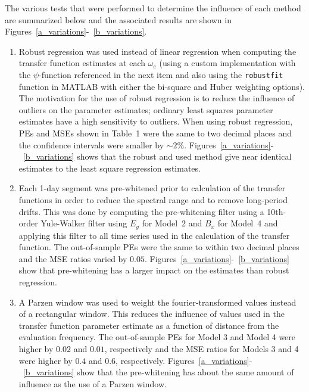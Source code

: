 \documentclass[draft,linenumbers]{agujournal2018}
\begin{document}
The various tests that were performed to determine the influence of each method are summarized below and the associated results are shown in Figures~\ref{a_variations}-~\ref{b_variations}.

\begin{enumerate}

\item Robust regression was used instead of linear regression when computing the transfer function estimates at each $\omega_e$ (using a custom implementation with the $\psi$-function referenced in the next item and also using the \texttt{robustfit} function in MATLAB with either the bi-square and Huber weighting options). The motivation for the use of robust regression is to reduce the influence of outliers on the parameter estimates; ordinary least squares parameter estimates have a high sensitivity to outliers. When using robust regression, PEs and MSEs shown in Table~1 were the same to two decimal places and the confidence intervals were smaller by $\sim 2$\%. Figures~\ref{a_variations}-~\ref{b_variations} shows that the robust and used method give near identical estimates to the least square regression estimates.

\item Each 1-day segment was pre-whitened prior to calculation of the transfer functions in order to reduce the spectral range and to remove long-period drifts. This was done by computing the pre-whitening filter using a 10th-order Yule-Walker filter using $E_y$ for Model~2 and $B_x$ for Model~4 and applying this filter to all time series used in the calculation of the transfer function. The out-of-sample PEs were the same to within two decimal places and the MSE ratios varied by $0.05$.  Figures~\ref{a_variations}-~\ref{b_variations} show that pre-whitening has a larger impact on the estimates than robust regression.

\item A Parzen window was used to weight the fourier-transformed values instead of a rectangular window. This reduces the influence of values used in the transfer function parameter estimate as a function of distance from the evaluation frequency. The out-of-sample PEs for Model 3 and Model 4 were higher by $0.02$ and $0.01$, respectively and the MSE ratios for Models 3 and 4 were higher by $0.4$ and $0.6$, respectively. Figures~\ref{a_variations}-~\ref{b_variations} show that the pre-whitening has about the same amount of influence as the use of a Parzen window.


\end{enumerate}
\end{document}
